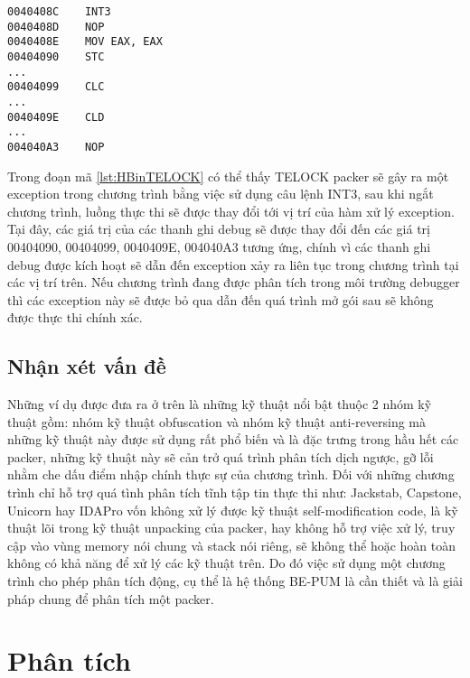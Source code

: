 \begin{code}
\begin{lstlisting}[captionpos=b,caption={Kỹ thuật Hardware Breakpoints sử dụng trong packer TELOCK},label={lst:HBinTELOCK},frame=single]
0040408C 	INT3
0040408D 	NOP
0040408E 	MOV EAX, EAX 
00404090 	STC
...
00404099 	CLC
...
0040409E 	CLD
...
004040A3 	NOP
\end{lstlisting}
\end{code} 

\hspace{0.5cm}Trong đoạn mã \ref {lst:HBinTELOCK} có thể thấy TELOCK packer sẽ gây ra một exception trong chương trình bằng việc sử dụng câu lệnh INT3, sau khi ngắt chương trình, luồng thực thi sẽ được thay đổi tới vị trí của hàm xử lý exception. Tại đây, các giá trị của các thanh ghi debug sẽ được thay đổi đến các giá trị 00404090, 00404099, 0040409E, 004040A3 tương ứng, chính vì các thanh ghi debug được kích hoạt sẽ dẫn đến exception xảy ra liên tục trong chương trình tại các vị trí trên. Nếu chương trình đang được phân tích trong môi trường debugger thì các exception này sẽ được bỏ qua dẫn đến quá trình mở gói sau sẽ không được thực thi chính xác.   

\subsection{Nhận xét vấn đề}

\hspace{0.5cm}Những ví dụ được đưa ra ở trên là những kỹ thuật nổi bật thuộc 2 nhóm kỹ thuật gồm: nhóm kỹ thuật obfuscation và nhóm kỹ thuật anti-reversing mà những kỹ thuật này được sử dụng rất phổ biến và là đặc trưng trong hầu hết các packer, những kỹ thuật này sẽ cản trở quá trình phân tích dịch ngược, gỡ lỗi nhằm che dấu điểm nhập chính thực sự của chương trình. Đối với những chương trình chỉ hỗ trợ quá tình phân tích tĩnh tập tin thực thi như: Jackstab, Capstone, Unicorn hay IDAPro vốn không xử lý được kỹ thuật self-modification code, là kỹ thuật lõi trong kỹ thuật unpacking của packer, hay không hỗ trợ việc xử lý, truy cập vào vùng memory nói chung và stack nói riêng, sẽ không thể hoặc hoàn toàn không có khả năng để xử lý các kỹ thuật trên. Do đó việc sử dụng một chương trình cho phép phân tích động, cụ thể là hệ thống BE-PUM là cần thiết và là giải pháp chung để phân tích một packer.

\section{Phân tích}

